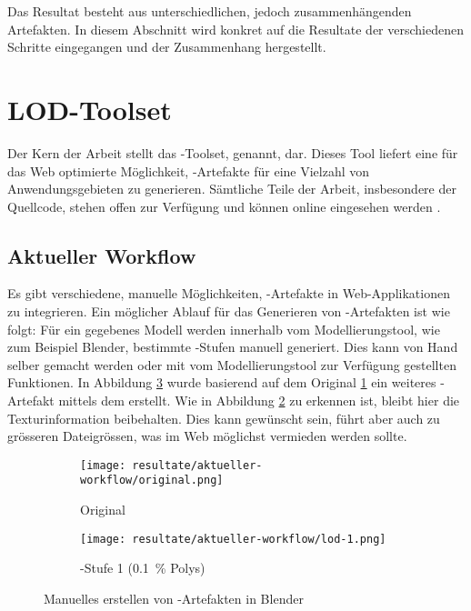 Das Resultat besteht aus unterschiedlichen, jedoch zusammenhängenden Artefakten. In diesem Abschnitt wird konkret auf die Resultate der verschiedenen Schritte eingegangen und der Zusammenhang hergestellt.

\section{LOD-Toolset}

Der Kern der Arbeit stellt das -Toolset,  genannt, dar. Dieses Tool liefert eine für das Web optimierte Möglichkeit, -Artefakte für eine Vielzahl von Anwendungsgebieten zu generieren. Sämtliche Teile der Arbeit, insbesondere der Quellcode, stehen offen zur Verfügung und können online eingesehen werden \cite{lode}.

\subsection{Aktueller Workflow}

Es gibt verschiedene, manuelle Möglichkeiten, -Artefakte in Web-Applikationen zu integrieren. Ein möglicher Ablauf für das Generieren von -Artefakten ist wie folgt:
Für ein gegebenes Modell werden innerhalb vom Modellierungstool, wie zum Beispiel Blender, bestimmte -Stufen manuell generiert. Dies kann von Hand selber gemacht werden oder mit vom Modellierungstool zur Verfügung gestellten Funktionen. In Abbildung \ref{fig:manualLodGenerationInBlender} wurde basierend auf dem Original \ref{fig:manualLodGenerationInBlenderOriginal} ein weiteres -Artefakt mittels dem  erstellt. Wie in Abbildung \ref{fig:manualLodGenerationInBlenderSimplified} zu erkennen ist, bleibt hier die Texturinformation beibehalten. Dies kann gewünscht sein, führt aber auch zu grösseren Dateigrössen, was im Web möglichst vermieden werden sollte.

\begin{figure}[H]
  \centering
  \begin{subfigure}{.45\textwidth}
    \centering
    \texttt{[image: resultate/aktueller-workflow/original.png]}
    \caption{Original}
    \label{fig:manualLodGenerationInBlenderOriginal}
  \end{subfigure}
  \begin{subfigure}{.45\textwidth}
    \centering
    \texttt{[image: resultate/aktueller-workflow/lod-1.png]}
    \caption{-Stufe 1 (0.1 \% Polys)}
    \label{fig:manualLodGenerationInBlenderSimplified}
  \end{subfigure}
  \caption{Manuelles erstellen von -Artefakten in Blender}
  \label{fig:manualLodGenerationInBlender}
\end{figure}

